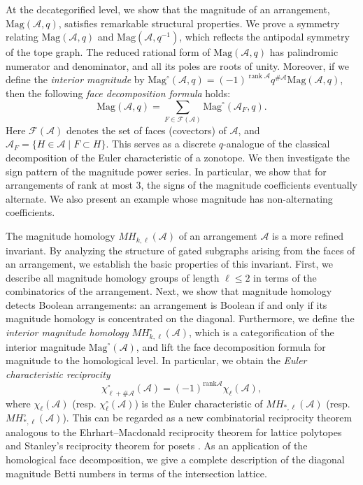 \documentclass{amsart}
\numberwithin{equation}{section}
\theoremstyle{plain}
\theoremstyle{remark}
\theoremstyle{definition}
\numberwithin{equation}{section}
\newcommand{\A}{\mathcal{A}}
\newcommand{\FF}{\mathcal{F}}
\newcommand{\Mag}{\mathrm{Mag}}
\DeclareMathOperator{\rank}{rank}
\begin{document}
At the decategorified level, we show that the magnitude of an arrangement, $\Mag(\mathcal{A}, q)$, satisfies remarkable structural properties.
We prove a symmetry relating $\Mag(\mathcal{A}, q)$ and $\Mag(\mathcal{A}, q^{-1})$, which reflects the antipodal symmetry of the tope graph.
The reduced rational form of $\Mag(\mathcal{A}, q)$ has palindromic numerator and denominator, and all its poles are roots of unity.
Moreover, if we define the \emph{interior magnitude} by $\Mag^\circ(\A,q)=(-1)^{\rank \A}q^{\#\A}\Mag(\A,q)$, then the following \emph{face decomposition formula} holds:
\[
\Mag(\A,q)=\sum_{F\in \mathcal{F}(\A)}\Mag^\circ(\A_F,q).
\]
Here $\FF(\A)$ denotes the set of faces (covectors) of $\A$, and $\A_F=\{H\in \A\mid F\subset H\}$.
This serves as a discrete $q$-analogue of the classical decomposition of the Euler characteristic of a zonotope.
We then investigate the sign pattern of the magnitude power series. In particular, we show that for arrangements of rank at most $3$, the signs of the magnitude coefficients eventually alternate. We also present an example whose magnitude has non-alternating coefficients.

The magnitude homology $MH_{k,\ell}(\A)$ of an arrangement $\A$ is a more refined invariant.
By analyzing the structure of gated subgraphs arising from the faces of an arrangement, we establish the basic properties of this invariant.
First, we describe all magnitude homology groups of length $\ell\leq 2$ in terms of the combinatorics of the arrangement.
Next, we show that magnitude homology detects Boolean arrangements: an arrangement is Boolean if and only if its magnitude homology is concentrated on the diagonal.
Furthermore, we define the \emph{interior magnitude homology} $MH^\circ_{k,\ell}(\A)$, which is a categorification of the interior magnitude $\Mag^\circ(\A)$, and lift the face decomposition formula for magnitude to the homological level.
In particular, we obtain the \emph{Euler characteristic reciprocity}
\[
\chi^\circ_{\ell+\#\A}(\A)=(-1)^{\mathrm{rank}\A}\chi_\ell(\A),
\]
where $\chi_\ell(\A)$ (resp. $\chi^\circ_\ell(\A)$) is the Euler characteristic of $MH_{*,\ell}(\A)$ (resp. $MH^\circ_{*,\ell}(\A)$).
This can be regarded as a new combinatorial reciprocity theorem analogous to the Ehrhart--Macdonald reciprocity theorem for lattice polytopes \cite{Ehrhart1967Reciprocity,Macdonald1971} and Stanley's reciprocity theorem for posets \cite{Stanley1970}.
As an application of the homological face decomposition, we give a complete description of the diagonal magnitude Betti numbers in terms of the intersection lattice.
\end{document}
